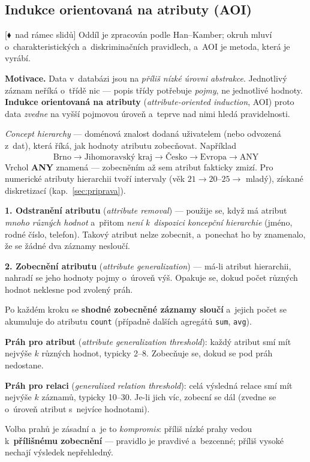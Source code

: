 \documentclass[11pt,a4paper]{article}
\theoremstyle{definition}
\newcommand{\mimo}{\textcolor{markcol}{\textsf{\footnotesize[$\blacklozenge$~nad rámec slidů]}}}
\begin{document}
\subsection{Indukce orientovaná na atributy (AOI)}
\label{ssec:aoi}

\mimo{} Oddíl je zpracován podle Han--Kamber; okruh mluví o~charakteristických
a~diskriminačních pravidlech, a~AOI je metoda, která je vyrábí.

\textbf{Motivace.} Data v~databázi jsou na \emph{příliš nízké úrovni abstrakce}. Jednotlivý
záznam  neříká o~třídě nic --- popis třídy potřebuje
\emph{pojmy}, ne jednotlivé hodnoty. \textbf{Indukce orientovaná na atributy}
(\emph{attribute-oriented induction}, AOI) proto data \emph{zvedne} na vyšší pojmovou úroveň
a~teprve nad nimi hledá pravidelnosti.

\begin{defbox}
\emph{Concept hierarchy} --- doménová znalost dodaná uživatelem (nebo odvozená z~dat), která
říká, jak hodnoty atributu zobecňovat. Například
\[ \text{Brno} \to \text{Jihomoravský kraj} \to \text{Česko} \to \text{Evropa} \to \mathrm{ANY} \]
Vrchol \textbf{ANY} znamená  --- zobecněním až sem atribut fakticky
zmizí. Pro numerické atributy hierarchii tvoří intervaly (věk $21 \to 20$--$25 \to$ mladý),
získané diskretizací (kap.~\ref{sec:priprava}).
\end{defbox}

\begin{defbox}
\textbf{1. Odstranění atributu} (\emph{attribute removal}) --- použije se, když má atribut
\emph{mnoho různých hodnot} a~přitom \emph{není k~dispozici koncepční hierarchie} (jméno,
rodné číslo, telefon). Takový atribut nelze zobecnit, a~ponechat ho by znamenalo, že se žádné
dva záznamy nesloučí.

\textbf{2. Zobecnění atributu} (\emph{attribute generalization}) --- má-li atribut hierarchii,
nahradí se jeho hodnoty pojmy o~úroveň výš. Opakuje se, dokud počet různých hodnot neklesne
pod zvolený práh.

Po každém kroku se \textbf{shodné zobecněné záznamy sloučí} a~jejich počet se akumuluje do
atributu \texttt{count} (případně dalších agregátů \texttt{sum}, \texttt{avg}).
\end{defbox}

\begin{defbox}
\textbf{Práh pro atribut} (\emph{attribute generalization threshold}): každý atribut smí mít
nejvýše $k$ různých hodnot, typicky 2--8. Zobecňuje se, dokud se pod práh nedostane.

\textbf{Práh pro relaci} (\emph{generalized relation threshold}): celá výsledná relace smí mít
nejvýše $k$ záznamů, typicky 10--30. Je-li jich víc, zobecní se dál (zvedne se o~úroveň
atribut s~nejvíce hodnotami).

Volba prahů je zásadní a~je to \emph{kompromis}: příliš nízké prahy vedou k~\textbf{přílišnému
zobecnění} --- pravidlo  je pravdivé a~bezcenné; příliš vysoké
nechají výsledek nepřehledný.
\end{defbox}
\end{document}
